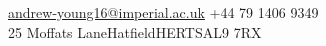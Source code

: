 \documentclass[10pt,a4paper]{article}
\begin{document}


\noindent\href{mailto:andrew-young16@imperial.ac.uk}{andrew-young16@imperial.ac.uk}\bull
+44 79 1406 9349\bull
\\

25 Moffats Lane\bull Hatfield\bull HERTS\bull AL9 7RX

\spacedhrule{0.9em}{-0.4em}

\end{document}
